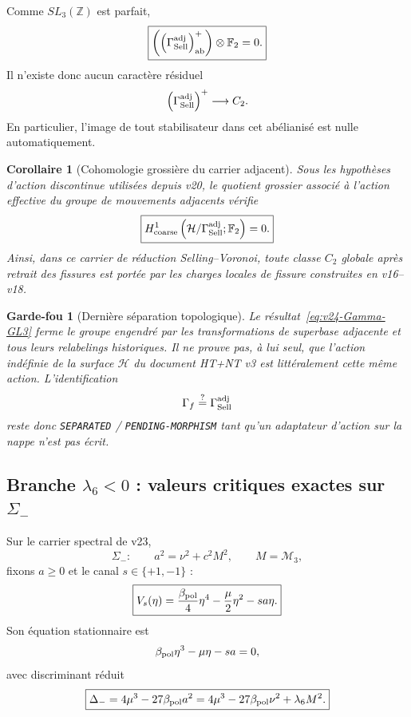 \documentclass[11pt,a4paper]{article}
\newtheorem{corollary}[theorem]{Corollaire}
\newtheorem{guardrail}[theorem]{Garde-fou}
\newcommand{\certSeparated}{\texttt{SEPARATED}}
\newcommand{\certPending}{\texttt{PENDING-MORPHISM}}
\begin{document}
Comme $SL_3(\mathbb Z)$ est parfait,
\begin{equation}\label{eq:v24-plus-ab}
 \boxed{
 \left(
 \left(\Gamma_{\rm Sell}^{\rm adj}\right)^+_{\rm ab}
 \right)
 \otimes\mathbb F_2
 =0.}
\end{equation}
Il n'existe donc aucun caractère résiduel
\[
 \left(\Gamma_{\rm Sell}^{\rm adj}\right)^+
 \longrightarrow C_2.
\]
En particulier, l'image de tout stabilisateur dans cet abélianisé est nulle automatiquement.

\begin{corollary}[Cohomologie grossière du carrier adjacent]\label{cor:v24-coarse-H1-zero}
Sous les hypothèses d'action discontinue utilisées depuis v20, le quotient grossier associé à l'action effective du groupe de mouvements adjacents vérifie
\begin{equation}\label{eq:v24-coarse-H1-zero}
 \boxed{
 H^1_{\rm coarse}
 \left(
 \mathcal H/\Gamma_{\rm Sell}^{\rm adj};\mathbb F_2
 \right)
 =0.}
\end{equation}
Ainsi, dans ce carrier de réduction Selling--Voronoi, toute classe $C_2$ globale après retrait des fissures est portée par les charges locales de fissure construites en v16--v18.
\end{corollary}

\begin{guardrail}[Dernière séparation topologique]
Le résultat~\eqref{eq:v24-Gamma-GL3} ferme le groupe engendré par les transformations de superbase adjacente et tous leurs relabelings historiques. Il ne prouve pas, à lui seul, que l'action indéfinie de la surface $\mathcal H$ du document HT+NT v3 est littéralement cette même action. L'identification
\[
 \Gamma_f\stackrel?=\Gamma_{\rm Sell}^{\rm adj}
\]
reste donc \certSeparated{} / \certPending{} tant qu'un adaptateur d'action sur la nappe n'est pas écrit.
\end{guardrail}

\subsection{Branche \texorpdfstring{$\lambda_6<0$}{lambda6<0} : valeurs critiques exactes sur \texorpdfstring{$\Sigma_-$}{Sigma-}}

Sur le carrier spectral de v23,
\[
 \Sigma_-:
 \qquad
 a^2=\nu^2+c^2M^2,
 \qquad
 M=\mathcal M_3,
\]
fixons $a\ge0$ et le canal $s\in\{+1,-1\}$ :
\begin{equation}\label{eq:v24-Vs}
 \boxed{
 V_s(\eta)
 =
 \frac{\beta_{\rm pol}}4\eta^4
 -\frac\mu2\eta^2
 -s a\eta.}
\end{equation}
Son équation stationnaire est
\[
 \beta_{\rm pol}\eta^3-\mu\eta-sa=0,
\]
avec discriminant réduit
\begin{equation}\label{eq:v24-Delta-minus}
 \boxed{
 \Delta_-
 =
 4\mu^3-27\beta_{\rm pol}a^2
 =
 4\mu^3-27\beta_{\rm pol}\nu^2+\lambda_6M^2.}
\end{equation}
\end{document}

